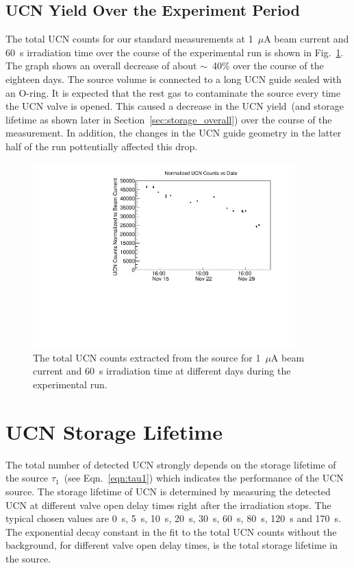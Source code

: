 \subsection{UCN Yield Over the Experiment Period}

The total UCN counts for our standard measurements at 1~$\mu$A beam
current and 60~s irradiation time over the course of the experimental
run is shown in Fig.~\ref{fig:UCNCounts_time}. The graph shows an
overall decrease of about $\sim$~40\% over the course of the eighteen
days. The source volume is connected to a long UCN guide sealed with
an O-ring. It is expected that the rest gas to contaminate the source
every time the UCN valve is opened. This caused a decrease in the UCN
yield~(and storage lifetime as shown later in
Section~\ref{sec:storage_overall}) over the course of the
measurement. In addition, the changes in the UCN guide geometry in the
latter half of the run pottentially affected this drop.


\begin{figure}[h]
  \centering
  \includegraphics[width=0.9\textwidth]{UCNCounts_vs_time.pdf}
  \caption{The total UCN counts extracted from the source for 1~$\mu$A
    beam current and 60~s irradiation time at different days during
    the experimental run. }
  \label{fig:UCNCounts_time}
\end{figure}

\section{UCN Storage Lifetime~\label{storagelifetime}}

The total number of detected UCN strongly depends on the storage
lifetime of the source $\tau_1$~(see Eqn.~\ref{eqn:tau1}) which
indicates the performance of the UCN source. The storage lifetime of
UCN is determined by measuring the detected UCN at different valve
open delay times right after the irradiation stops.  The typical
chosen values are 0~s, 5~s, 10~s, 20~s, 30~s, 60~s, 80~s, 120~s and
170~s.
The exponential decay constant in the fit to the total UCN counts
without the background, for different valve open delay times, is the
total storage lifetime in the source.

